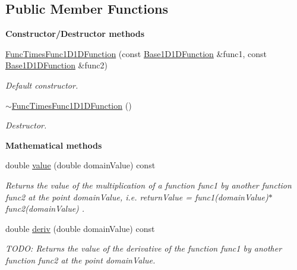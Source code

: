 \subsection*{Public Member Functions}
\begin{Indent}{\bf Constructor/\-Destructor methods}\par
\begin{DoxyCompactItemize}
\item 
\hyperlink{class_q_u_e_s_o_1_1_func_times_func1_d1_d_function_a7177db0aae0494fa706966bdd25799d4}{Func\-Times\-Func1\-D1\-D\-Function} (const \hyperlink{class_q_u_e_s_o_1_1_base1_d1_d_function}{Base1\-D1\-D\-Function} \&func1, const \hyperlink{class_q_u_e_s_o_1_1_base1_d1_d_function}{Base1\-D1\-D\-Function} \&func2)
\begin{DoxyCompactList}\small\item\em Default constructor. \end{DoxyCompactList}\item 
\hyperlink{class_q_u_e_s_o_1_1_func_times_func1_d1_d_function_ae89986fdbccb311f3f5d946937df4248}{$\sim$\-Func\-Times\-Func1\-D1\-D\-Function} ()
\begin{DoxyCompactList}\small\item\em Destructor. \end{DoxyCompactList}\end{DoxyCompactItemize}
\end{Indent}
\begin{Indent}{\bf Mathematical methods}\par
\begin{DoxyCompactItemize}
\item 
double \hyperlink{class_q_u_e_s_o_1_1_func_times_func1_d1_d_function_adebec22c4730abfe9d5000785a77d000}{value} (double domain\-Value) const 
\begin{DoxyCompactList}\small\item\em Returns the value of the multiplication of a function {\ttfamily func1} by another function {\ttfamily func2} at the point {\ttfamily domain\-Value}, i.\-e. return\-Value = {\ttfamily func1(domain\-Value)$\ast$func2(domain\-Value) }. \end{DoxyCompactList}\item 
double \hyperlink{class_q_u_e_s_o_1_1_func_times_func1_d1_d_function_aac7e1e05101253947079615bf7b5ce6b}{deriv} (double domain\-Value) const 
\begin{DoxyCompactList}\small\item\em T\-O\-D\-O\-: Returns the value of the derivative of the function {\ttfamily func1} by another function {\ttfamily func2} at the point {\ttfamily domain\-Value}. \end{DoxyCompactList}\end{DoxyCompactItemize}
\end{Indent}
